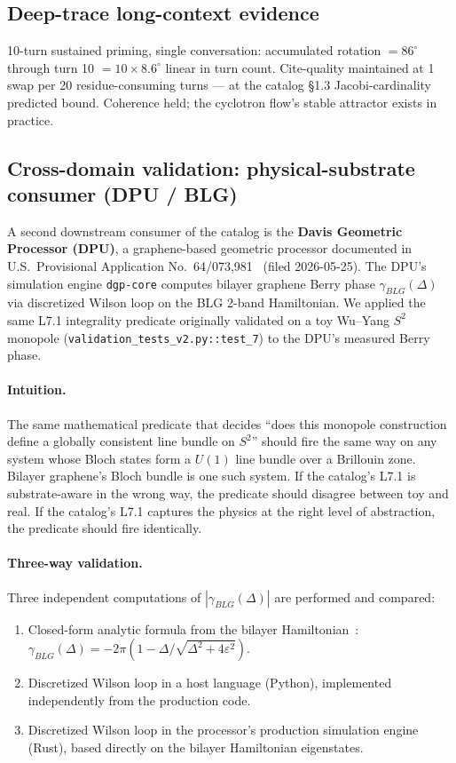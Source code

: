 \documentclass[11pt,letterpaper]{article}
\begin{document}
\subsection{Deep-trace long-context evidence}

10-turn sustained priming, single conversation: accumulated
rotation $= 86^\circ$ through turn 10 $= 10 \times 8.6^\circ$
linear in turn count. Cite-quality maintained at 1 swap per 20
residue-consuming turns --- at the catalog \S1.3 Jacobi-cardinality
predicted bound. Coherence held; the cyclotron flow's stable
attractor exists in practice.

\subsection{Cross-domain validation: physical-substrate consumer (DPU / BLG)}
\label{sec:validation-dpu}

A second downstream consumer of the catalog is the \textbf{Davis
Geometric Processor (DPU)}, a graphene-based geometric processor
documented in U.S.\ Provisional Application
No.~64/073,981~\cite{davis2026dpu} (filed 2026-05-25). The DPU's
simulation engine \texttt{dgp-core} computes bilayer graphene Berry
phase $\gamma_{BLG}(\Delta)$ via discretized Wilson loop on the BLG
2-band Hamiltonian. We applied the same L7.1 integrality predicate
originally validated on a toy Wu--Yang $S^2$ monopole
(\texttt{validation\_tests\_v2.py::test\_7}) to the DPU's measured
Berry phase.

\paragraph{Intuition.}
The same mathematical predicate that decides ``does this monopole
construction define a globally consistent line bundle on $S^2$''
should fire the same way on any system whose Bloch states form a
$U(1)$ line bundle over a Brillouin zone. Bilayer graphene's Bloch
bundle is one such system. If the catalog's L7.1 is substrate-aware
in the wrong way, the predicate should disagree between toy and
real. If the catalog's L7.1 captures the physics at the right level
of abstraction, the predicate should fire identically.

\paragraph{Three-way validation.}
Three independent computations of $|\gamma_{BLG}(\Delta)|$ are
performed and compared:
\begin{enumerate}[nosep]
\item Closed-form analytic formula from the bilayer
  Hamiltonian~\cite{mccann2013bilayer}:
  $\gamma_{BLG}(\Delta)
  = -2\pi (1 - \Delta / \sqrt{\Delta^2 + 4\varepsilon^2})$.
\item Discretized Wilson loop in a host language (Python),
  implemented independently from the production code.
\item Discretized Wilson loop in the processor's production
  simulation engine (Rust), based directly on the bilayer
  Hamiltonian eigenstates.
\end{enumerate}
\end{document}

